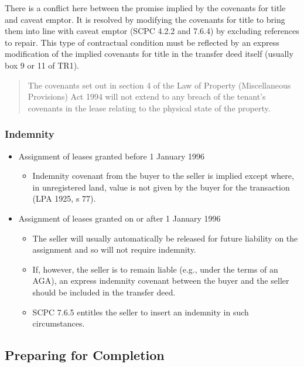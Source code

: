 \documentclass[
]{article}
\providecommand{\tightlist}{%
  \setlength{\itemsep}{0pt}\setlength{\parskip}{0pt}}
\begin{document}
There is a conflict here between the promise implied by the covenants
for title and caveat emptor. It is resolved by modifying the covenants
for title to bring them into line with caveat emptor (SCPC 4.2.2 and
7.6.4) by excluding references to repair. This type of contractual
condition must be reflected by an express modification of the implied
covenants for title in the transfer deed itself (usually box 9 or 11 of
TR1).

\begin{quote}
The covenants set out in section 4 of the Law of Property (Miscellaneous
Provisions) Act 1994 will not extend to any breach of the tenant's
covenants in the lease relating to the physical state of the property.
\end{quote}

\hypertarget{indemnity}{%
\subsubsection{Indemnity}\label{indemnity}}

\begin{itemize}
\tightlist
\item
  Assignment of leases granted before 1 January 1996

  \begin{itemize}
  \tightlist
  \item
    Indemnity covenant from the buyer to the seller is implied except
    where, in unregistered land, value is not given by the buyer for the
    transaction (LPA 1925, s 77).
  \end{itemize}
\item
  Assignment of leases granted on or after 1 January 1996

  \begin{itemize}
  \tightlist
  \item
    The seller will usually automatically be released for future
    liability on the assignment and so will not require indemnity.
  \item
    If, however, the seller is to remain liable (e.g., under the terms
    of an AGA), an express indemnity covenant between the buyer and the
    seller should be included in the transfer deed.
  \item
    SCPC 7.6.5 entitles the seller to insert an indemnity in such
    circumstances.
  \end{itemize}
\end{itemize}

\hypertarget{preparing-for-completion}{%
\subsection{Preparing for Completion}\label{preparing-for-completion}}
\end{document}
